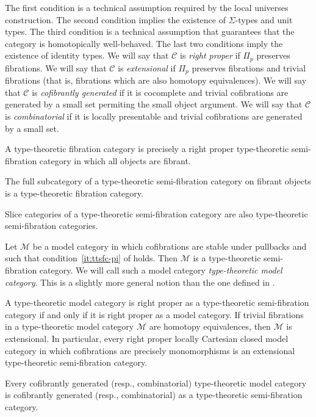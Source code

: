 \documentclass[reqno]{amsart}
\theoremstyle{definition}
\theoremstyle{remark}
\newcommand{\scat}[1]{\mathcal{#1}}
\numberwithin{figure}{section}
\begin{document}
The first condition is a technical assumption required by the local universes construction.
The second condition implies the existence of $\Sigma$-types and unit types.
The third condition is a technical assumption that guarantees that the category is homotopically well-behaved.
The last two conditions imply the existence of identity types.
We will say that $\scat{C}$ is \emph{right proper} if $\Pi_p$ preserves fibrations.
We will say that $\scat{C}$ is \emph{extensional} if $\Pi_p$ preserves fibrations and trivial fibrations (that is, fibrations which are also homotopy equivalences).
We will say that $\scat{C}$ is \emph{cofibrantly generated} if it is cocomplete and trivial cofibrations are generated by a small set permiting the small object argument.
We will say that $\scat{C}$ is \emph{combinatorial} if it is locally presentable and trivial cofibrations are generated by a small set.

\begin{remark}
A type-theoretic fibration category is precisely a right proper type-theoretic semi-fibration category in which all objects are fibrant.
\end{remark}

\begin{remark}
The full subcategory of a type-theoretic semi-fibration category on fibrant objects is a type-theoretic fibration category.
\end{remark}

\begin{remark}
Slice categories of a type-theoretic semi-fibration category are also type-theoretic semi-fibration categories.
\end{remark}

\begin{example}
Let $\scat{M}$ be a model category in which cofibrations are stable under pullbacks and such that condition~\eqref{it:ttsfc-pi} of  holds.
Then $\scat{M}$ is a type-theoretic semi-fibration category.
We will call such a model category \emph{type-theoretic model category}.
This is a slightly more general notion than the one defined in \cite[Definition~2.12]{shul-inv}.

A type-theoretic model category is right proper as a type-theoretic semi-fibration category if and only if it is right proper as a model category.
If trivial fibrations in a type-theoretic model category $\scat{M}$ are homotopy equivalences, then $\scat{M}$ is extensional.
In particular, every right proper locally Cartesian closed model category in which cofibrations are precisely monomorphisms is an extensional type-theoretic semi-fibration category.

Every cofibrantly generated (resp., combinatorial) type-theoretic model category is cofibrantly generated (resp., combinatorial) as a type-theoretic semi-fibration category.
\end{example}
\end{document}
